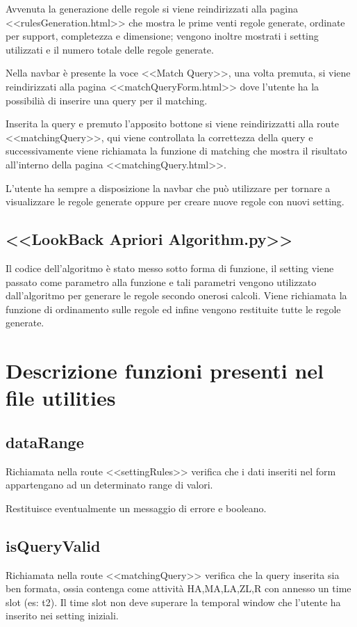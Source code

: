 \documentclass[a4paper]{article}
\begin{document}
Avvenuta la generazione delle regole si viene reindirizzati alla pagina <<rulesGeneration.html>> che mostra le prime venti regole generate, ordinate per support, completezza e dimensione; vengono inoltre mostrati i setting utilizzati e il numero totale delle regole generate.

Nella navbar è presente la voce <<Match Query>>, una volta premuta, si viene reindirizzati alla pagina <<matchQueryForm.html>> dove l'utente ha la possibilià di inserire una query per il matching.

Inserita la query e premuto l'apposito bottone si viene reindirizzatti alla route <<matchingQuery>>, qui viene controllata la correttezza della query e successivamente viene richiamata la funzione di matching che mostra il risultato all'interno della pagina <<matchingQuery.html>>.

L'utente ha sempre a disposizione la navbar che può utilizzare per tornare a visualizzare le regole generate oppure per creare nuove regole con nuovi setting.

\subsection{<<LookBack Apriori Algorithm.py>>}
Il codice dell'algoritmo è stato messo sotto forma di funzione, il setting viene passato come parametro alla funzione e tali parametri vengono utilizzato dall'algoritmo per generare le regole secondo onerosi calcoli.
Viene richiamata la funzione di ordinamento sulle regole ed infine vengono restituite tutte le regole generate.


\section{Descrizione funzioni presenti nel file utilities}
\subsection{dataRange}
Richiamata nella route <<settingRules>> verifica che i dati inseriti nel form appartengano ad un determinato range di valori.

Restituisce eventualmente un messaggio di errore e booleano.

\subsection{isQueryValid}
Richiamata nella route <<matchingQuery>> verifica che la query inserita sia ben formata, ossia contenga come attività HA,MA,LA,ZL,R con annesso un time slot (es: t2). Il time slot non deve superare la temporal window che l'utente ha inserito nei setting iniziali.
\end{document}
